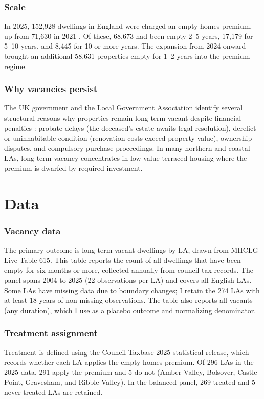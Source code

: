 \documentclass[12pt]{article}
\begin{document}
\subsubsection*{Scale} In 2025, 152,928 dwellings in England were charged an empty homes premium, up from 71,630 in 2021 \citep{mhclg2025ctb}. Of these, 68,673 had been empty 2--5 years, 17,179 for 5--10 years, and 8,445 for 10 or more years. The expansion from 2024 onward brought an additional 58,631 properties empty for 1--2 years into the premium regime.

\subsubsection*{Why vacancies persist} The UK government and the Local Government Association identify several structural reasons why properties remain long-term vacant despite financial penalties \citep{lga2023empty, wilsonhousingcommons}: probate delays (the deceased's estate awaits legal resolution), derelict or uninhabitable condition (renovation costs exceed property value), ownership disputes, and compulsory purchase proceedings. In many northern and coastal LAs, long-term vacancy concentrates in low-value terraced housing where the premium is dwarfed by required investment.

\section{Data}
\label{sec:data}

\subsubsection*{Vacancy data} The primary outcome is long-term vacant dwellings by LA, drawn from MHCLG Live Table 615. This table reports the count of all dwellings that have been empty for six months or more, collected annually from council tax records. The panel spans 2004 to 2025 (22 observations per LA) and covers all English LAs. Some LAs have missing data due to boundary changes; I retain the 274 LAs with at least 18 years of non-missing observations. The table also reports all vacants (any duration), which I use as a placebo outcome and normalizing denominator.

\subsubsection*{Treatment assignment} Treatment is defined using the Council Taxbase 2025 statistical release, which records whether each LA applies the empty homes premium. Of 296 LAs in the 2025 data, 291 apply the premium and 5 do not (Amber Valley, Bolsover, Castle Point, Gravesham, and Ribble Valley). In the balanced panel, 269 treated and 5 never-treated LAs are retained.
\end{document}
